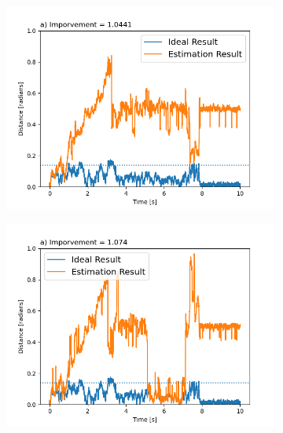 \documentclass[preprint,3p]{elsarticle}
\begin{document}
\begin{figure}[b]
	\begin{subfigure}{0.33\textwidth}
		\includegraphics[width=\textwidth]{./Images/154590_Beta=1.png}
	\end{subfigure}
	\begin{subfigure}{0.33\textwidth}
		\includegraphics[width=\textwidth]{./Images/154590_Beta=05.png}
	\end{subfigure}
	\begin{subfigure}{0.33\textwidth}

\end{subfigure}
\end{figure}
\end{document}
